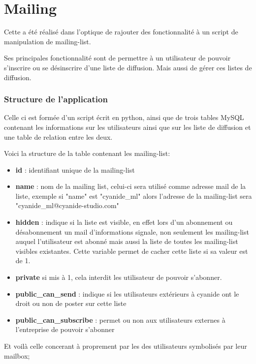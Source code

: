 \part*{Mailing}

Cette a été réalisé dans l'optique de rajouter des fonctionnalité à un script de manipulation de mailing-list.

Ses principales fonctionnalité sont de permettre à un utilisateur de pouvoir s'inscrire ou se désinscrire d'une liste de diffusion. Mais aussi de gérer ces listes de diffusion.

\section*{Structure de l'application}

Celle ci est formée d'un script écrit en python, ainsi que de trois tables MySQL contenant les informations sur les utilisateurs ainsi que sur les liste de diffusion et une table de relation entre les deux.

Voici la structure de la table contenant les mailing-list:

\begin{itemize}
	\item \textbf{id} : identifiant unique de la mailing-list
	\item \textbf{name} : nom de la mailing list, celui-ci sera utilisé comme adresse mail de la liste, exemple si "name" est "cyanide\_ml" alors l'adresse de la mailing-list sera "cyanide\_ml@cyanide-studio.com"
	\item \textbf{hidden} : indique si la liste est visible, en effet lors d'un abonnement ou désabonnement un mail d'informations signale, non seulement les mailing-list auquel l'utilisateur est abonné mais aussi la liste de toutes les mailing-list visibles existantes. Cette variable permet de cacher cette liste si sa valeur est de 1.
	\item \textbf{private} si mis à 1, cela interdit les utilisateur de pouvoir s'abonner.
	\item \textbf{public\_can\_send} : indique si les utilisateurs extérieurs à cyanide ont le droit ou non de poster sur cette liste
	\item \textbf{public\_can\_subscribe} : permet ou non aux utilisateurs externes à l'entreprise de pouvoir s'abonner
\end{itemize}

Et voilà celle concerant à proprement par les des utilisateurs symbolisés par leur mailbox;

